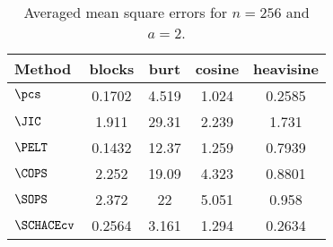 \begin{table}[ht]
\centering
\begin{tabular}{lcccc}
  \hline
Method & blocks & burt & cosine & heavisine \\ 
  \hline
$\pcs$ & 0.1702 & 4.519 & 1.024 & 0.2585 \\ 
  $\JIC$ & 1.911 & 29.31 & 2.239 & 1.731 \\ 
  $\PELT$ & 0.1432 & 12.37 & 1.259 & 0.7939 \\ 
  $\COPS$ & 2.252 & 19.09 & 4.323 & 0.8801 \\ 
  $\SOPS$ & 2.372 &    22 & 5.051 & 0.958 \\ 
  $\SCHACEcv$ & 0.2564 & 3.161 & 1.294 & 0.2634 \\ 
   \hline
\end{tabular}
\caption{Averaged mean square errors for $n = 256$ and $a = 2$.} 
\label{tab:aMSEn256a2}
\end{table}
